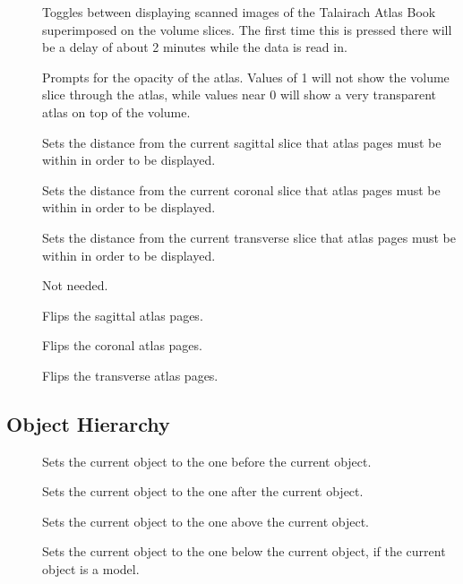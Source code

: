 \begin{description}
\item[]  Toggles between displaying scanned images
        of the Talairach Atlas Book superimposed on the volume slices.  The
        first time this is pressed there will be a delay of about 2 minutes
        while the data is read in.
\item[]  Prompts for the opacity of the atlas.
        Values of 1 will not show the volume slice through the atlas, while
        values near 0 will show a very transparent atlas on top of the volume.
\item[]  Sets the distance from the current
        sagittal slice that atlas pages must be within in order to be
        displayed.
\item[]  Sets the distance from the current
        coronal slice that atlas pages must be within in order to be
        displayed.
\item[]  Sets the distance from the current
        transverse slice that atlas pages must be within in order to be
        displayed.
\item[]  Not needed.
\item[]  Flips the sagittal atlas pages.
\item[]  Flips the coronal atlas pages.
\item[]  Flips the transverse atlas pages.
\end{description}

\subsection{Object Hierarchy}

\begin{description}
\item[]  Sets the current object to the one before
                the current object.
\item[]  Sets the current object to the one after
                the current object.
\item[]  Sets the current object to the one above
                the current object.
\item[]  Sets the current object to the one below
                the current object, if the current object is a model.
\end{description}

